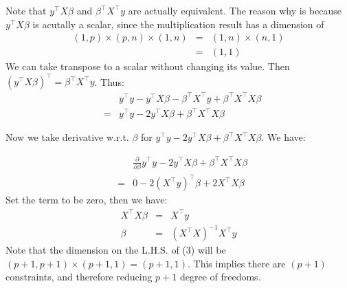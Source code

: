 \documentclass{article}
\theoremstyle{MyNonumberplain}
\theoremstyle{break}
\newcommand{\T}{^\intercal}
\theoremstyle{break}
\theoremstyle{break}
\theoremstyle{break}
\begin{document}
\begin{thmbox}
\begin{prfbox}
    Note that $y\T X\beta$ and $\beta\T X\T y$ are actually equivalent. The reason why is because $y\T X\beta$ is acutally a scalar, since the multiplication result has a dimension of
    \begin{eqnarray*}
        (1,p) \times (p,n) \times (1,n) &=& (1,n) \times (n,1)\\
                                        &=& (1,1)
    \end{eqnarray*}
    We can take transpose to a scalar without changing its value. Then $(y\T X\beta)\T = \beta\T X\T y$. Thus:
    \begin{eqnarray*}
        & &y\T y - y\T X\beta - \beta\T X\T y + \beta\T X\T X\beta\\
        &=&y\T y - 2y\T X\beta + \beta\T X\T X\beta
    \end{eqnarray*}

    Now we take derivative w.r.t. $\beta$ for $y\T y - 2y\T X\beta + \beta\T X\T X\beta$. We have:


    \end{prfbox}
\end{thmbox} 

\begin{thmbox}
    \begin{prfbox}
        \begin{eqnarray*}
            & &\frac{\partial}{\partial\beta} y\T y - 2y\T X\beta + \beta\T X\T X\beta\\
            &=& 0-2(X\T y)\T\beta+2X\T X\beta
        \end{eqnarray*}   
        Set the term to be zero, then we have:
        \begin{eqnarray}
            X\T X\beta &=& X\T y\\
            \beta &=& (X\T X)^{-1} X\T y
        \end{eqnarray}
        Note that the dimension on the L.H.S. of (3) will be $(p+1,p+1)\times(p+1,1)=(p+1,1)$. This implies there are $(p+1)$ constraints, and therefore reducing $p+1$ degree of freedoms.
    \end{prfbox}
\end{thmbox}
\end{document}

